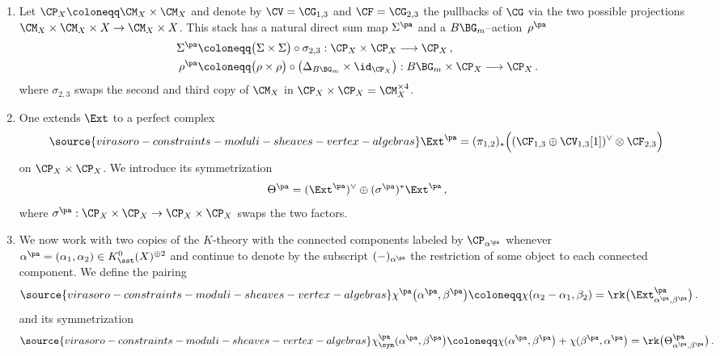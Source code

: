 \begin{definition}
\notready
\label{def: pairVOA}
\begin{enumerate}
\item Let $\CP_X\coloneqq\CM_X\times \CM_X$ and denote by $\CV=\CG_{1,3}$ and $\CF=\CG_{2,3}$ the pullbacks of $\CG$ via the two possible projections $\CM_X\times \CM_X\times X\to \CM_X\times X$. This stack has a natural direct sum map $\Sigma^{\pa}$ and a $B\BG_m$--action~$\rho^{\pa}$
    \begin{align*}
\Sigma^{\pa}&\coloneqq \big(\Sigma\times \Sigma\big)\circ \sigma_{2,3} : \CP_X\times \CP_X\longrightarrow \CP_X\,,\\
\rho^{\pa}&\coloneqq \big(\rho\times\rho\big) \circ\big(\Delta_{B\BG_m}\times \id_{\CP_X}\big): B\BG_m\times \CP_X\longrightarrow \CP_X\,.
\end{align*}
where $\sigma_{2,3}$ swaps the second and third copy of $\CM_X$ in $\CP_X\times \CP_X=\CM_X^{\times 4}$.
\item One extends $\Ext$ to a perfect complex
    \begin{equation}
    \label{Eq: Extpacomplex}
\source{virasoro-constraints-moduli-sheaves-vertex-algebras}
    \Ext^{\pa} = (\pi_{1,2})_\ast\Big((\CF_{1,3}\oplus \CV_{1,3}[1])^\vee\otimes \CF_{2,3}\Big)\,
    \end{equation}
on $\CP_X\times \CP_X$.
We introduce its symmetrization
$$
\Theta^{\pa} = (\Ext^{\pa})^\vee \oplus (\sigma^{\pa})^\ast\Ext^{\pa}\,,
$$
where $\sigma^{\pa}:\CP_X\times \CP_X\to \CP_X\times \CP_X$ swaps the two factors.


\item We now work with two copies of the $K$-theory  with the connected components labeled by $\CP_{\alpha^{\pa}}$ whenever $\alpha^{\pa}=(\alpha_1,\alpha_ 2)\in K_\sst^0(X)^{\oplus 2}$ and continue to denote by the subscript $(-)_{\alpha^{\pa}}$ the restriction of some object to each connected component. We  define the pairing
\begin{align*}
\label{Eq: pairing}
\source{virasoro-constraints-moduli-sheaves-vertex-algebras}
\chi^{\pa}\big(\alpha^{\pa},\beta^{\pa}\big) \coloneqq \chi(\alpha_2 -\alpha_1,\beta_2) =\rk\big(\Ext^{\pa}_{\alpha^{\pa},\beta^{\pa}}\big) \,.
\end{align*}
and its symmetrization
\begin{equation*}\label{Eq: pairing}
\source{virasoro-constraints-moduli-sheaves-vertex-algebras}
\chi^{\pa}_{\sym}(\alpha^{\pa},\beta^{\pa}\big) \coloneqq \chi(\alpha^{\pa},\beta^{\pa}\big)+ \chi(\beta^{\pa}, \alpha^{\pa}\big)=\rk\big(\Theta^{\pa}_{\alpha^{\pa},\beta^{\pa}}\big) \,.
\end{equation*}
\end{enumerate}
\end{definition}

